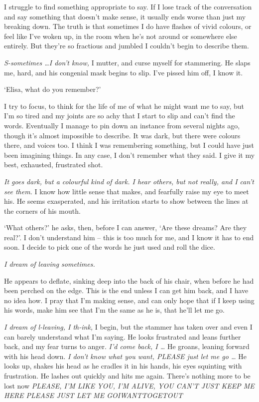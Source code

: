 I struggle to find something appropriate to say. If I lose track of
the conversation and say something that doesn't make sense, it usually
ends worse than just my breaking down. The truth is that sometimes I
do have flashes of vivid colours, or feel like I've woken up, in the
room when he's not around or somewhere else entirely. But they're so
fractious and jumbled I couldn't begin to describe them.

 \textit{ S-sometimes \ldots I don't know,} I mutter, and curse myself
for stammering. He slaps me, hard, and his congenial mask begins to
slip. I've pissed him off, I know it.

`Elisa, what do you remember?'

I try to focus, to think for the life of me of what he might want me
to say, but I'm so tired and my joints are so achy that I start to
slip and can't find the words. Eventually I manage to pin down an
instance from several nights ago, though it's almost impossible to
describe. It was dark, but there were colours there, and voices too. I
think I was remembering something, but I could have just been
imagining things. In any case, I don't remember what they said. I give
it my best, exhausted, frustrated shot.

 \textit{ It goes dark, but a colourful kind of dark. I hear others,
but not really, and I can't see them.} I know how little sense that
makes, and fearfully raise my eye to meet his. He seems exasperated,
and his irritation starts to show between the lines at the corners of
his mouth.

`What others?' he asks, then, before I can answer, `Are these dreams?
Are they real?'. I don't understand him – this is too much for me, and
I know it has to end soon. I decide to pick one of the words he just
used and roll the dice.

 \textit{I dream of leaving sometimes.}

He appears to deflate, sinking deep into the back of his chair, when
before he had been perched on the edge. This is the end unless I can
get him back, and I have no idea how. I pray that I'm making sense,
and can only hope that if I keep using his words, make him see that
I'm the same as he is, that he'll let me go.

\textit{
I dream of l-leaving, I th-ink,} I begin, but the stammer has taken
over and even I can barely understand what I'm saying. He looks
frustrated and leans further back, and my fear turns to
anger. \textit{I'd come back, I \ldots} He groans, leaning forward
with his head down. \textit{I don't know what you want, PLEASE just
let me go \ldots} He looks up, shakes his head as he cradles it in his
hands, his eyes squinting with frustration. He lashes out quickly and
hits me again. There's nothing more to be lost now \textit{PLEASE, I'M
LIKE YOU, I'M ALIVE, YOU CAN'T JUST KEEP ME HERE PLEASE JUST LET ME
GOIWANTTOGETOUT}

